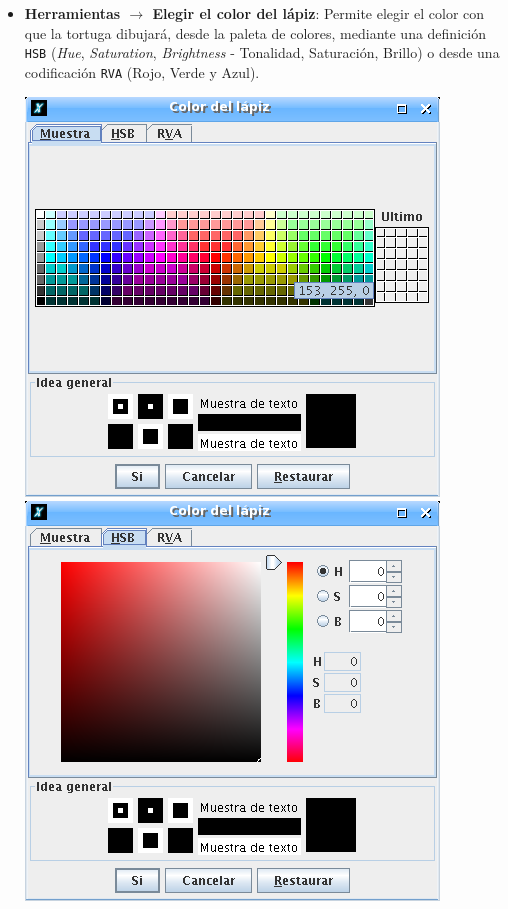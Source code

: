 \begin{itemize}
   \item \textbf{Herramientas $\rightarrow$ Elegir el color del l\'apiz}:
       Permite elegir el color con que la
      tortuga dibujar\'a, desde la paleta de colores, mediante una
      definici\'on \texttt{HSB} (\textit{Hue}, \textit{Saturation}, 
      \textit{Brightness} - Tonalidad, Saturaci\'on, Brillo) o desde
      una codificaci\'on \texttt{RVA} (Rojo, Verde y Azul).
      \begin{center}
         \includegraphics[scale=0.3]{Imagenes/03_Opciones-Menu/ColorLapiz_01.png}
         \includegraphics[scale=0.3]{Imagenes/03_Opciones-Menu/ColorLapiz_02.png}

\end{center}
\end{itemize}
